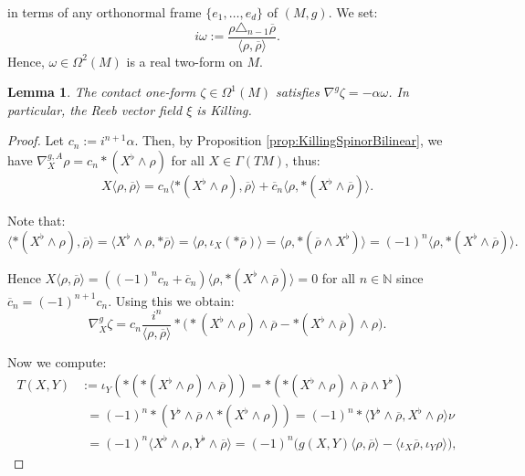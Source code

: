 \documentclass[10pt,a4paper,twoside,reqno]{amsart}
\theoremstyle{plain}
\newtheorem{lemma}[thm]{Lemma}
\theoremstyle{definition}
\theoremstyle{remark}
\def\N{\mathbb{N}}
\newcommand{\escal}[1]{\langle#1\rangle}
\begin{document}
\noindent
in terms of any orthonormal frame $\{e_1,\hdots , e_{d}\}$ of $(M,g)$. We set:
\begin{equation*}
i\omega := \frac{\rho\triangle_{n-1}\overline{\rho}}{\escal{\rho,\overline{\rho}}}.
\end{equation*}
Hence, $\omega \in \Omega^2(M)$ is a real two-form on $M$.

\begin{lemma}\label{lemma:nabla_zeta}
The contact one-form $\zeta\in\Omega^1(M)$ satisfies $\nabla^g\zeta = -\alpha\omega$. In particular, the Reeb vector field $\xi$ is Killing.
\end{lemma}

\begin{proof}
Let $c_n:=i^{n+1}\alpha$. Then, by Proposition \ref{prop:KillingSpinorBilinear}, we have $\nabla^{g,A}_X\rho=c_n*(X^\flat\wedge\rho)$ for all $X\in\Gamma(TM)$, thus:
\begin{equation*}
X\escal{\rho,\overline{\rho}}=c_n\escal{*(X^\flat\wedge\rho),\overline{\rho}}+\overline{c}_n\escal{\rho,*(X^\flat\wedge\overline{\rho})}.
\end{equation*}

\noindent
Note that:
\begin{equation*}
\escal{*(X^\flat\wedge\rho),\overline{\rho}}=\escal{X^\flat\wedge\rho,*\overline{\rho}}=\escal{\rho,\iota_X(*\overline{\rho})}=\escal{\rho,*(\overline{\rho}\wedge X^\flat)}=(-1)^n\escal{\rho,*(X^\flat\wedge\overline{\rho})}.
\end{equation*}

\noindent
Hence $X\escal{\rho,\overline{\rho}}=((-1)^nc_n+\overline{c}_n)\escal{\rho,*(X^\flat\wedge\overline{\rho})}=0$ for all $n\in\N$ since $\overline{c}_n=(-1)^{n+1}c_n$. Using this we obtain:
\begin{equation*}
\nabla^{g}_X\zeta=c_n\frac{i^n}{\escal{\rho,\overline{\rho}}}*\big(*(X^\flat\wedge\rho)\wedge\overline{\rho} - *(X^\flat\wedge\overline{\rho})\wedge\rho\big).
\end{equation*}

\noindent
Now we compute: \begin{align*}
    T(X,Y)&:=\iota_Y(*(*(X^\flat\wedge\rho)\wedge\overline{\rho}))=*(*(X^\flat\wedge\rho)\wedge\overline{\rho}\wedge Y^\flat)\\
    &{\phantom{:}}=(-1)^n*(Y^\flat\wedge\overline{\rho}\wedge*(X^\flat\wedge\rho))=(-1)^n*\escal{Y^\flat\wedge\overline{\rho},X^\flat\wedge\rho}\nu\\
    &{\phantom{:}}=(-1)^n\escal{X^\flat\wedge\rho,Y^\flat\wedge\overline{\rho}}=(-1)^n\big(g(X,Y)\escal{\rho,\overline{\rho}}-\escal{\iota_X\overline{\rho},\iota_Y\rho}\big),
\end{align*}


\end{proof}
\end{document}

